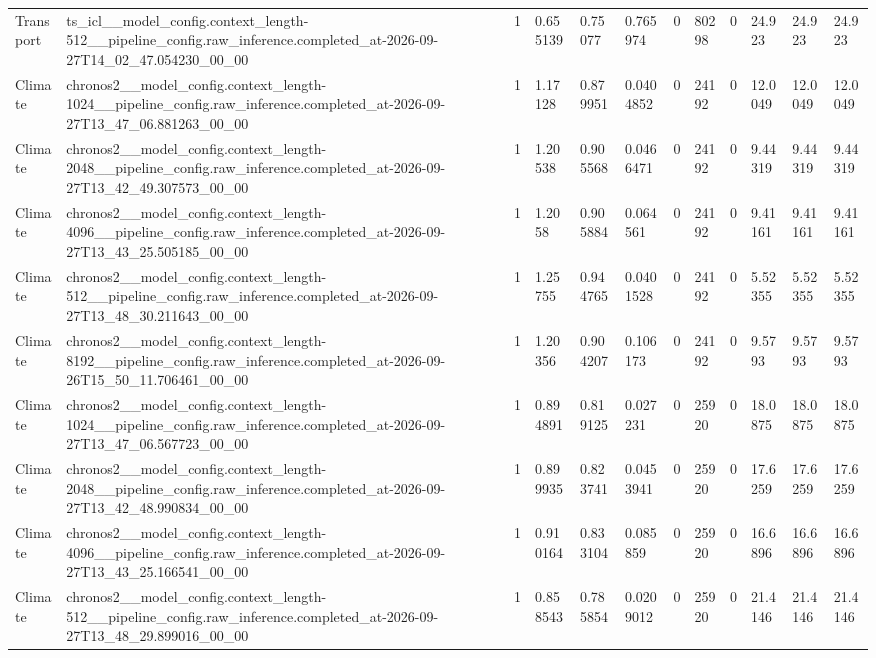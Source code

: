 \begin{tabular}{llllllllllll}
Transport & ts\_icl\_\_model\_config.context\_length-512\_\_pipeline\_config.raw\_inference.completed\_at-2026-09-27T14\_02\_47.054230\_00\_00 & 1 & 0.655139 & 0.75077 & 0.765974 & 0 & 80298 & 0 & 24.923 & 24.923 & 24.923 \\
Climate & chronos2\_\_model\_config.context\_length-1024\_\_pipeline\_config.raw\_inference.completed\_at-2026-09-27T13\_47\_06.881263\_00\_00 & 1 & 1.17128 & 0.879951 & 0.0404852 & 0 & 24192 & 0 & 12.0049 & 12.0049 & 12.0049 \\
Climate & chronos2\_\_model\_config.context\_length-2048\_\_pipeline\_config.raw\_inference.completed\_at-2026-09-27T13\_42\_49.307573\_00\_00 & 1 & 1.20538 & 0.905568 & 0.0466471 & 0 & 24192 & 0 & 9.44319 & 9.44319 & 9.44319 \\
Climate & chronos2\_\_model\_config.context\_length-4096\_\_pipeline\_config.raw\_inference.completed\_at-2026-09-27T13\_43\_25.505185\_00\_00 & 1 & 1.2058 & 0.905884 & 0.064561 & 0 & 24192 & 0 & 9.41161 & 9.41161 & 9.41161 \\
Climate & chronos2\_\_model\_config.context\_length-512\_\_pipeline\_config.raw\_inference.completed\_at-2026-09-27T13\_48\_30.211643\_00\_00 & 1 & 1.25755 & 0.944765 & 0.0401528 & 0 & 24192 & 0 & 5.52355 & 5.52355 & 5.52355 \\
Climate & chronos2\_\_model\_config.context\_length-8192\_\_pipeline\_config.raw\_inference.completed\_at-2026-09-26T15\_50\_11.706461\_00\_00 & 1 & 1.20356 & 0.904207 & 0.106173 & 0 & 24192 & 0 & 9.5793 & 9.5793 & 9.5793 \\
Climate & chronos2\_\_model\_config.context\_length-1024\_\_pipeline\_config.raw\_inference.completed\_at-2026-09-27T13\_47\_06.567723\_00\_00 & 1 & 0.894891 & 0.819125 & 0.027231 & 0 & 25920 & 0 & 18.0875 & 18.0875 & 18.0875 \\
Climate & chronos2\_\_model\_config.context\_length-2048\_\_pipeline\_config.raw\_inference.completed\_at-2026-09-27T13\_42\_48.990834\_00\_00 & 1 & 0.899935 & 0.823741 & 0.0453941 & 0 & 25920 & 0 & 17.6259 & 17.6259 & 17.6259 \\
Climate & chronos2\_\_model\_config.context\_length-4096\_\_pipeline\_config.raw\_inference.completed\_at-2026-09-27T13\_43\_25.166541\_00\_00 & 1 & 0.910164 & 0.833104 & 0.085859 & 0 & 25920 & 0 & 16.6896 & 16.6896 & 16.6896 \\
Climate & chronos2\_\_model\_config.context\_length-512\_\_pipeline\_config.raw\_inference.completed\_at-2026-09-27T13\_48\_29.899016\_00\_00 & 1 & 0.858543 & 0.785854 & 0.0209012 & 0 & 25920 & 0 & 21.4146 & 21.4146 & 21.4146 \\

\end{tabular}
